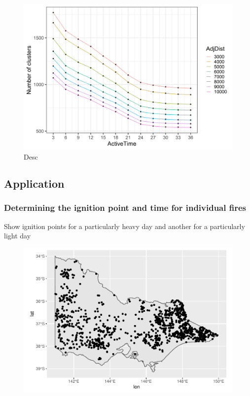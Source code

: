 \begin{Schunk}
\begin{figure}

{\centering \includegraphics[width=0.8\linewidth]{figures/clustering_tuning_2} 

}

\caption[Desc]{Desc}\label{fig:vis2}
\end{figure}
\end{Schunk}

\hypertarget{application}{%
\subsection{Application}\label{application}}

\hypertarget{determining-the-ignition-point-and-time-for-individual-fires}{%
\subsubsection{Determining the ignition point and time for individual
fires}\label{determining-the-ignition-point-and-time-for-individual-fires}}

Show ignition points for a particularly heavy day and another for a
particularly light day

\begin{Schunk}
\begin{figure}

{\centering \includegraphics[width=0.8\linewidth]{clustering_paper_files/figure-latex/app1-1} 

}

\end{figure}
\end{Schunk}

